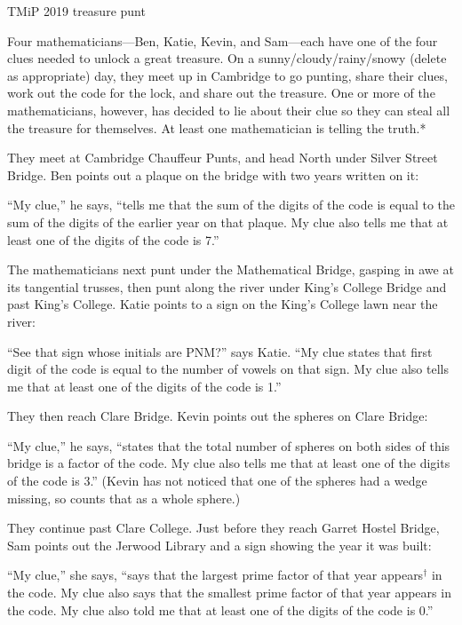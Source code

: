 \documentclass[11pt]{article}
\newcommand{\CDtitle}[1]{
{\setmainfont{Raleway SemiBold}\LARGE #1}\par
}
\newlength{\defaultparskip}
\begin{document}
\hfill%
\begin{minipage}[t][192mm]{132mm}
\setlength{\parskip}{\defaultparskip}

\CDtitle{TMiP 2019 treasure punt}
Four mathematicians---Ben, Katie, Kevin, and Sam---each have one of the four clues needed to unlock a great treasure.
On a sunny/cloudy/rainy/snowy (delete as appropriate) day, they meet up in Cambridge to go punting, share their clues, work out the code for the lock,
and share out the treasure. One or more of the mathematicians, however, has decided to lie about their clue so they can steal all the treasure for themselves.
At least one mathematician is telling the truth.*

They meet at Cambridge Chauffeur Punts, and head North under Silver Street Bridge. Ben points out a plaque on the bridge with two years written on it:

``My clue,'' he says, ``tells me that the sum of the digits of the code is equal to the sum of the digits of the earlier year on that plaque. My clue also tells me that at least one of the digits of the code is 7.''

The mathematicians next punt under the Mathematical Bridge, gasping in awe at its tangential trusses, then punt along the river under King's College Bridge and past King's College.
Katie points to a sign on the King's College lawn near the river:

``See that sign whose initials are PNM?'' says Katie. ``My clue states that first digit of the code is equal to the number of vowels on that sign.
My clue also tells me that at least one of the digits of the code is 1.''

They then reach Clare Bridge. Kevin points out the spheres on Clare Bridge:

``My clue,'' he says, ``states that the total number of spheres on both sides of this bridge is a factor of the code. My clue also tells me that at least one of the digits of the code is 3.''
(Kevin has not noticed that one of the spheres had a wedge missing, so counts that as a whole sphere.)

They continue past Clare College. Just before they reach Garret Hostel Bridge, Sam points out the Jerwood Library and a sign showing the year it was built:

``My clue,'' she says, ``says that the largest prime factor of that year appears$^\text{†}$ in the code.
My clue also says that the smallest prime factor of that year appears in the code. My clue also told me that at least one of the digits of the code is 0.''


\end{minipage}
\end{document}
